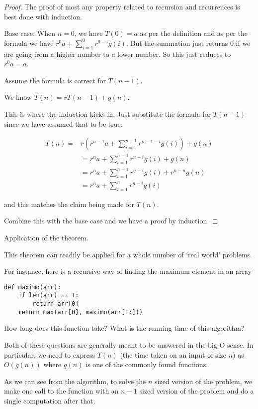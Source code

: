 \documentclass[12pt]{article}
\begin{document}
\begin{proof}
The proof of most any property related to recursion and recurrences is best done with induction. 

Base case: When $n=0$, we have $T(0)= a$ as per the definition and as per the formula we have $r^0 a + \sum_{i=1}^0 r^{0-i}g(i)$. But the summation just returns 0 if we are going from a higher number to a lower number. So this just reduces to $r^0 a = a$.

Assume the formula is correct for $T(n-1)$.

We know $T(n) = rT(n-1) + g(n)$.

This is where the induction kicks in. Just substitute the formula for $T(n-1)$ since we have assumed that to be true.

\begin{align*}
T(n) = 
&r (r^{n-1} a + \sum_{i=1}^{n-1} r^{n-1-i} g(i)) + g(n) \\
&= r^n a + \sum_{i=1}^{n-1} r^{n-i} g(i) + g(n) \\
&= r^n a + \sum_{i=1}^{n-1} r^{n-i} g(i) + r^{n-n}g(n) \\
&= r^n a + \sum_{i=1}^{n} r^{n-i} g(i) 
\end{align*}

and this matches the claim being made for $T(n)$.

Combine this with the base case and we have a proof by induction.

\end{proof}

Application of the theorem.

This theorem can readily be applied for a whole number of `real world' problems.

For instance, here is a recursive way of finding the maximum element in an array

\begin{verbatim}
def maximo(arr):
    if len(arr) == 1:
        return arr[0]
    return max(arr[0], maximo(arr[1:]))
\end{verbatim}

How long does this function take? What is the running time of this algorithm? 

Both of these questions are generally meant to be answered in the big-O sense. In particular, we need to express $T(n)$ (the time taken on an input of size $n$) as $O(g(n))$ where $g(n)$ is one of the commonly found functions.

As we can see from the algorithm, to solve the $n$ sized version of the problem, we make one call to the function with an $n-1$ sized version of the problem and do a single computation after that.
\end{document}
